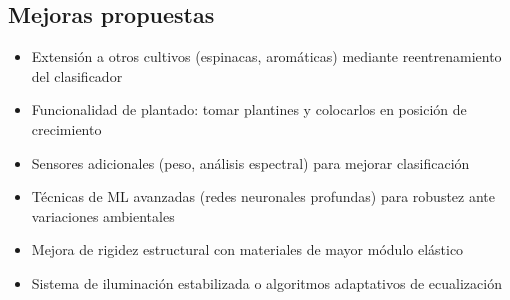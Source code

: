 \subsection*{Mejoras propuestas}

\begin{itemize}[label=$\bullet$]
    \item Extensión a otros cultivos (espinacas, aromáticas) mediante reentrenamiento del clasificador
    \item Funcionalidad de plantado: tomar plantines y colocarlos en posición de crecimiento
    \item Sensores adicionales (peso, análisis espectral) para mejorar clasificación
    \item Técnicas de ML avanzadas (redes neuronales profundas) para robustez ante variaciones ambientales
    \item Mejora de rigidez estructural con materiales de mayor módulo elástico
    \item Sistema de iluminación estabilizada o algoritmos adaptativos de ecualización
\end{itemize}